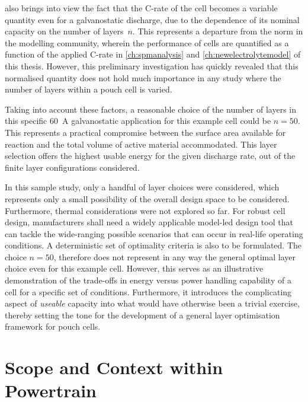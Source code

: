 

  also brings  into view  the fact  that the
\mbox{C-rate} of the  cell becomes a variable quantity even  for a galvanostatic
discharge,  due to  the dependence  of  its nominal  capacity on  the number  of
layers~$n$.  This  represents  a  departure  from  the  norm  in  the  modelling
community, wherein the performance of cells  are quantified as a function of the
applied C-rate \eg{}  in \cref{ch:spmanalysis} and \cref{ch:newelectrolytemodel}
of this  thesis. However,  this preliminary  investigation has  quickly revealed
that this normalised  quantity does not hold much importance  in any study where
the number of layers within a pouch cell is varied.

Taking into account  these factors, a reasonable choice of  the number of layers
in  this specific  \SI{60}{\ampere} galvanostatic  application for  this example
cell  could  be $n=50$.  This  represents  a  practical compromise  between  the
surface area  available for  reaction and  the total  volume of  active material
accommodated.  This layer  selection offers  the highest  usable energy  for the
given discharge rate, out of the finite layer configurations considered.

In this  sample study, only  a handful of  layer choices were  considered, which
represents  only  a  small  possibility  of  the  overall  design  space  to  be
considered. Furthermore,  thermal considerations were  not explored so  far. For
robust  cell design,  manufacturers  shall need  a  widely applicable  model-led
design tool that  can tackle the wide-ranging possible scenarios  that can occur
in real-life operating conditions. A deterministic set of optimality criteria is
also to  be formulated. The choice  $n=50$, therefore does not  represent in any
way the general  optimal layer choice even for this  example cell. However, this
serves as an illustrative demonstration of the trade-offs in energy versus power
handling capability of a cell for  a specific set of conditions. Furthermore, it
introduces the  complicating aspect of  \emph{useable} capacity into  what would
have  otherwise been  a  trivial  exercise, thereby  setting  the  tone for  the
development of a general layer optimisation framework for pouch cells.

\section{Scope and Context within  Powertrain}

